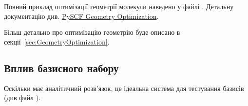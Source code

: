 Повний приклад оптимізації геометрії молекули  наведено у файлі .
Детальну документацію див. \href{https://pyscf.org/user/geomopt.html}{PySCF Geometry Optimization}.

Більш детально про оптимізацію геометрію буде описано в секції~\ref{sec:GeometryOptimization}.

%
%
%
%

\subsection{Вплив базисного набору}

Оскільки  має аналітичний розв'язок, це ідеальна система
для тестування базисів (див файл ).

